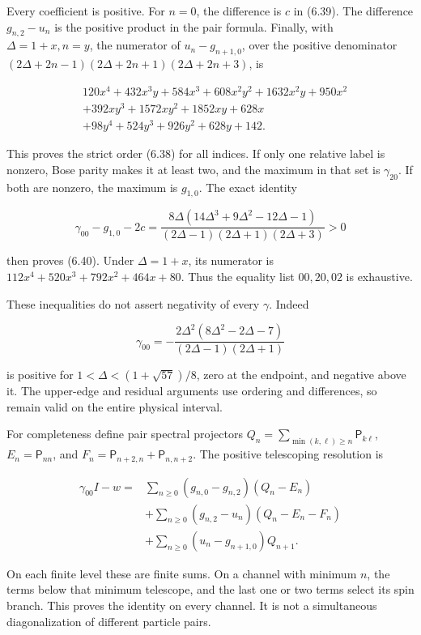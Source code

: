 Every coefficient is positive. For \(n=0\), the difference is \(c\) in (6.39). The difference \(g_{n,2}-u_n\) is the positive product in the pair formula. Finally, with \(\Delta=1+x,n=y\), the numerator of \(u_n-g_{n+1,0}\), over the positive denominator \((2\Delta+2n-1)(2\Delta+2n+1)(2\Delta+2n+3)\), is

\[
\begin{aligned}
&120x^4+432x^3y+584x^3+608x^2y^2+1632x^2y+950x^2\\
&+392xy^3+1572xy^2+1852xy+628x\\
&+98y^4+524y^3+926y^2+628y+142.
\end{aligned}
\tag{G.2}
\]

This proves the strict order (6.38) for all indices. If only one relative label is nonzero, Bose parity makes it at least two, and the maximum in that set is \(\gamma_{20}\). If both are nonzero, the maximum is \(g_{1,0}\). The exact identity

\[
\gamma_{00}-g_{1,0}-2c=
\frac{8\Delta(14\Delta^3+9\Delta^2-12\Delta-1)}
{(2\Delta-1)(2\Delta+1)(2\Delta+3)}>0
\tag{G.3}
\]

then proves (6.40). Under \(\Delta=1+x\), its numerator is \(112x^4+520x^3+792x^2+464x+80\). Thus the equality list \(00,20,02\) is exhaustive.

These inequalities do not assert negativity of every \(\gamma\). Indeed

\[
\gamma_{00}=-\frac{2\Delta^2(8\Delta^2-2\Delta-7)}{(2\Delta-1)(2\Delta+1)}
\]

is positive for \(1<\Delta<(1+\sqrt{57})/8\), zero at the endpoint, and negative above it. The upper-edge and residual arguments use ordering and differences, so remain valid on the entire physical interval.

For completeness define pair spectral projectors \(Q_n=\sum_{\min(k,\ell)\ge n}\mathsf P_{k\ell}\), \(E_n=\mathsf P_{nn}\), and \(F_n=\mathsf P_{n+2,n}+\mathsf P_{n,n+2}\). The positive telescoping resolution is

\[
\begin{aligned}
\gamma_{00}I-w={}&\sum_{n\ge0}(g_{n,0}-g_{n,2})(Q_n-E_n)\\
&+\sum_{n\ge0}(g_{n,2}-u_n)(Q_n-E_n-F_n)\\
&+\sum_{n\ge0}(u_n-g_{n+1,0})Q_{n+1}.
\end{aligned}
\tag{G.4}
\]

On each finite level these are finite sums. On a channel with minimum \(n\), the terms below that minimum telescope, and the last one or two terms select its spin branch. This proves the identity on every channel. It is not a simultaneous diagonalization of different particle pairs.

